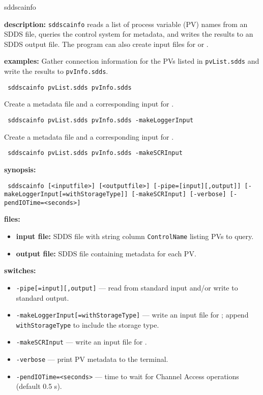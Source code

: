 %
%
\begin{sddsprog}{sddscainfo}
\item \textbf{description:}
  \verb+sddscainfo+ reads a list of process variable (PV) names from an SDDS file,
  queries the control system for metadata, and writes the results to an SDDS output file.
  The program can also create input files for  or .

\item \textbf{examples:}
  Gather connection information for the PVs listed in \verb+pvList.sdds+ and write the results to \verb+pvInfo.sdds+.
  \begin{flushleft}{\tt
sddscainfo pvList.sdds pvInfo.sdds
  }\end{flushleft}
  Create a metadata file and a corresponding input for .
  \begin{flushleft}{\tt
sddscainfo pvList.sdds pvInfo.sdds -makeLoggerInput
  }\end{flushleft}
  Create a metadata file and a corresponding input for .
  \begin{flushleft}{\tt
sddscainfo pvList.sdds pvInfo.sdds -makeSCRInput
  }\end{flushleft}

\item \textbf{synopsis:}
  \begin{flushleft}{\tt
sddscainfo [<inputfile>] [<outputfile>]\
[-pipe=[input][,output]]\
[-makeLoggerInput[=withStorageType]]\
[-makeSCRInput]\
[-verbose]\
[-pendIOTime=<seconds>]
  }\end{flushleft}

\item \textbf{files:}
  \begin{itemize}
  \item \textbf{input file:} SDDS file with string column \verb|ControlName| listing PVs to query.
  \item \textbf{output file:} SDDS file containing metadata for each PV.
  \end{itemize}

\item \textbf{switches:}
  \begin{itemize}
  \item {\tt -pipe[=input][,output]} --- read from standard input and/or write to standard output.
  \item {\tt -makeLoggerInput[=withStorageType]} --- write an input file for ; append \verb|withStorageType| to include the storage type.
  \item {\tt -makeSCRInput} --- write an input file for .
  \item {\tt -verbose} --- print PV metadata to the terminal.
  \item {\tt -pendIOTime=<seconds>} --- time to wait for Channel Access operations (default 0.5 s).
  \end{itemize}


\end{sddsprog}
